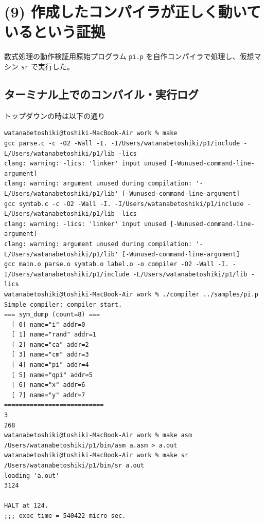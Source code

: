 \documentclass[11pt,a4paper,dvipdfmx]{bxjsarticle}
\begin{document}
\newpage

\section*{(9) 作成したコンパイラが正しく動いているという証拠}
数式処理の動作検証用原始プログラム \texttt{pi.p} を自作コンパイラで処理し、仮想マシン \texttt{sr} で実行した。

\subsection*{ターミナル上でのコンパイル・実行ログ}
トップダウンの時は以下の通り
\begin{lstlisting}[breaklines=true, basicstyle=\footnotesize\ttfamily, frame=single, caption={pi.p のトップダウンの実行結果と実行時間}]
watanabetoshiki@toshiki-MacBook-Air work % make                      
gcc parse.c -c -O2 -Wall -I. -I/Users/watanabetoshiki/p1/include -L/Users/watanabetoshiki/p1/lib -lics
clang: warning: -lics: 'linker' input unused [-Wunused-command-line-argument]
clang: warning: argument unused during compilation: '-L/Users/watanabetoshiki/p1/lib' [-Wunused-command-line-argument]
gcc symtab.c -c -O2 -Wall -I. -I/Users/watanabetoshiki/p1/include -L/Users/watanabetoshiki/p1/lib -lics
clang: warning: -lics: 'linker' input unused [-Wunused-command-line-argument]
clang: warning: argument unused during compilation: '-L/Users/watanabetoshiki/p1/lib' [-Wunused-command-line-argument]
gcc main.o parse.o symtab.o label.o -o compiler -O2 -Wall -I. -I/Users/watanabetoshiki/p1/include -L/Users/watanabetoshiki/p1/lib -lics
watanabetoshiki@toshiki-MacBook-Air work % ./compiler ../samples/pi.p
Simple compiler: compiler start.
=== sym_dump (count=8) ===
  [ 0] name="i" addr=0
  [ 1] name="rand" addr=1
  [ 2] name="ca" addr=2
  [ 3] name="cm" addr=3
  [ 4] name="pi" addr=4
  [ 5] name="qpi" addr=5
  [ 6] name="x" addr=6
  [ 7] name="y" addr=7
===========================
3
268
watanabetoshiki@toshiki-MacBook-Air work % make asm                  
/Users/watanabetoshiki/p1/bin/asm a.asm > a.out
watanabetoshiki@toshiki-MacBook-Air work % make sr                   
/Users/watanabetoshiki/p1/bin/sr a.out
loading 'a.out'
3124

HALT at 124.
;;; exec time = 540422 micro sec.
\end{lstlisting}
\end{document}
